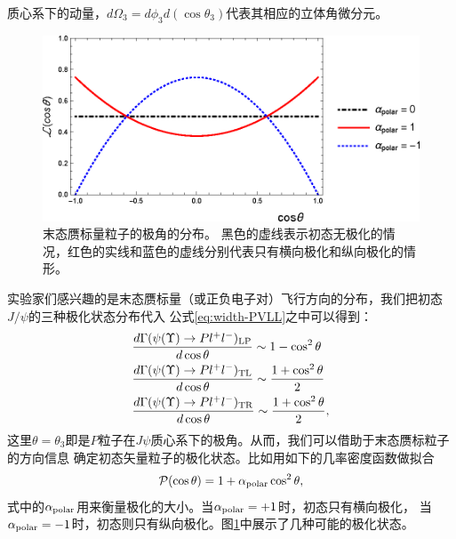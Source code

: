 质心系下的动量，$d\Omega_{3} = d \phi_{3}d(\cos\theta_{3})$代表其相应的立体角微分元。
\begin{figure}[!htbp]
\centering
\includegraphics[width=0.9 \linewidth]{figures/angle.eps}
\caption{%
    末态赝标量粒子的极角的分布。
     黑色的虚线表示初态无极化的情况，红色的实线和蓝色的虚线分别代表只有横向极化和纵向极化的情形。
    }%
\label{fig:angle}
\end{figure}
实验家们感兴趣的是末态赝标量（或正负电子对）飞行方向的分布，我们把初态$J/\psi$的三种极化状态分布代入
公式\ref{eq:width-PVLL}之中可以得到：
\begin{equation}
\begin{split}
    & \frac{d\Gamma(\psi(\Upsilon) \to Pl^{+}l^{-}){}_{\rm{LP}}}{d\cos\theta} \sim  1- \cos^{2}\theta
    \\ & \frac{d\Gamma(\psi(\Upsilon) \to Pl^{+}l^{-}){}_{\rm{TL}}}{d\cos\theta} \sim \frac{1+ \cos^{2}\theta}{2}
    \\ & \frac{d\Gamma(\psi(\Upsilon) \to Pl^{+}l^{-}){}_{\rm{TR}}}{d\cos\theta} \sim \frac{1+ \cos^{2}\theta}{2},
\end{split}
\label{equ:angle}
\end{equation}
这里$\theta=\theta_3$即是$P$粒子在$J\psi$质心系下的极角。从而，我们可以借助于末态赝标粒子的方向信息
确定初态矢量粒子的极化状态。比如用如下的几率密度函数做拟合
\begin{equation}
     \mathcal{P}(\cos\theta) = 1 + \alpha_{\rm{polar}} \cos^{2}\theta,
\end{equation}
式中的$\alpha_{\rm polar}$用来衡量极化的大小。当$\alpha_{\rm polar} = +1$时，初态只有横向极化，
当$\alpha_{\rm{polar}} = -1$时，初态则只有纵向极化。图\ref{fig:angle}中展示了几种可能的极化状态。

